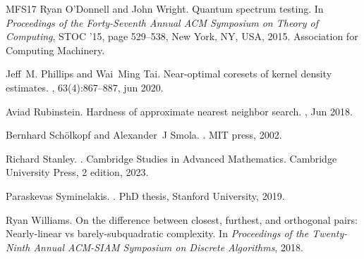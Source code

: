 \documentclass[10pt,a4paper]{article}
\theoremstyle{remark}
\numberwithin{equation}{section}
\numberwithin{theorem}{section}
\begin{document}
\begin{thebibliography}{MFS{\etalchar{+}}17}
Ryan O'Donnell and John Wright.
\newblock Quantum spectrum testing.
\newblock In {\em Proceedings of the Forty-Seventh Annual ACM Symposium on
  Theory of Computing}, STOC '15, page 529–538, New York, NY, USA, 2015.
  Association for Computing Machinery.

Jeff~M. Phillips and Wai~Ming Tai.
\newblock Near-optimal coresets of kernel density estimates.
, 63(4):867–887, jun 2020.

Aviad Rubinstein.
\newblock Hardness of approximate nearest neighbor search.
, Jun 2018.

Bernhard Sch{\"o}lkopf and Alexander~J Smola.
.
\newblock MIT press, 2002.

Richard Stanley.
.
\newblock Cambridge Studies in Advanced Mathematics. Cambridge University
  Press, 2 edition, 2023.

Paraskevas Syminelakis.
.
\newblock PhD thesis, Stanford University, 2019.

Ryan Williams.
\newblock On the difference between closest, furthest, and orthogonal pairs:
  Nearly-linear vs barely-subquadratic complexity.
\newblock In {\em Proceedings of the Twenty-Ninth Annual ACM-SIAM Symposium on
  Discrete Algorithms}, 2018.

\end{thebibliography}
\end{document}
